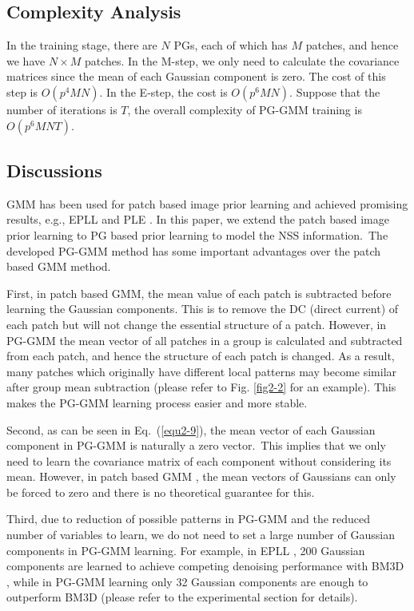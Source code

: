 \subsection{Complexity Analysis}
In the training stage, there are $N$ PGs, each of which has $M$ patches, and hence we have $N\times M$ patches. In the M-step, we only need to calculate the covariance matrices since the mean of each Gaussian component is zero. The cost of this step is $O(p^{4}MN)$. In the E-step, the cost is $O(p^{6}MN)$. Suppose that the number of iterations is $T$, the overall complexity of PG-GMM training is $O(p^{6}MNT)$.
\subsection{Discussions}
GMM has been used for patch based image prior learning and achieved promising results, e.g., EPLL \cite{epll} and PLE \cite{ple}. In this paper, we extend the patch based image prior learning to PG based prior learning to model the NSS information.\ The developed PG-GMM method has some important advantages over the patch based GMM method.

First, in patch based GMM, the mean value of each patch is subtracted before learning the Gaussian components. This is to remove the DC (direct current) of each patch but will not change the essential structure of a patch. However, in PG-GMM the mean vector of all patches in a group is calculated and subtracted from each patch, and hence the structure of each patch is changed. As a result, many patches which originally have different local patterns may become similar after group mean subtraction (please refer to Fig. \ref{fig2-2} for an example). This makes the PG-GMM learning process easier and more stable. 

Second, as can be seen in Eq.\ (\ref{equ2-9}), the mean vector of each Gaussian component in PG-GMM is naturally a zero vector.\ This implies that we only need to learn the covariance matrix of each component without considering its mean. However, in patch based GMM \cite{epll}, the mean vectors of Gaussians can only be forced to zero and there is no theoretical guarantee for this.

Third, due to reduction of possible patterns in PG-GMM and the reduced number of variables to learn, we do not need to set a large number of Gaussian components in PG-GMM learning. For example, in EPLL \cite{epll}, 200 Gaussian components are learned to achieve competing denoising performance with BM3D \cite{bm3d}, while in PG-GMM learning only 32 Gaussian components are enough to outperform BM3D (please refer to the experimental section for details).
